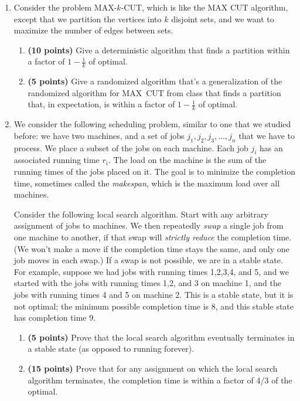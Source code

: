 \documentclass[11pt]{article}
\begin{document}
\begin{enumerate}
\item 
Consider the problem MAX-$k$-CUT, which is like the MAX CUT
algorithm, except that we partition the vertices into $k$ disjoint sets,
and we want to maximize the number of edges between sets. 
\begin{enumerate}
\item
{\bf (10 points)}
Give a deterministic algorithm
that finds a partition within a factor of $1-\frac1k$ of optimal.
\item
{\bf (5 points)}
Give a randomized algorithm that's a generalization of the randomized algorithm for MAX~CUT from class
that finds a partition that, in expectation, is within a factor of $1-\frac1k$ of optimal.
\end{enumerate}

\item
We consider the following scheduling problem, similar to one
  that we studied before: we have two machines, and a set of jobs
  $j_1,j_2,j_3,\ldots,j_n$ that we have to process.  We place a subset
  of the jobs on each machine.  Each job $j_i$ has an associated
  running time $r_i$.  The load on the machine is the sum of the
  running times of the jobs placed on it.  The goal is to minimize the
  completion time, sometimes called the {\em makespan}, which is the maximum load over all machines.

Consider the following local search algorithm.  Start with any
arbitrary assignment of jobs to machines.  We then repeatedly {\em
  swap} a single job from one machine to another, if that swap will
{\em strictly reduce} the completion time.  (We won't make a move if
the completion time stays the same, and only one job moves in each
swap.)  If a swap is not possible, we are in a stable state.  For
example, suppose we had jobs with running times 1,2,3,4, and 5, and we
started with the jobs with running times 1,2, and 3 on machine 1, and
the jobs with running times 4 and 5 on machine 2.  This is a stable
state, but it is not optimal; the minimum possible completion time is
8, and this stable state has completion time 9.

\begin{enumerate}
\item
{\bf (5 points)}
Prove that the local search algorithm eventually terminates in a stable state (as opposed to running forever).
\item
{\bf (15 points)}
Prove that for any assignment on which the local search algorithm terminates, the completion time is within a factor of 4/3 of the optimal.


\end{enumerate}
\end{enumerate}
\end{document}
